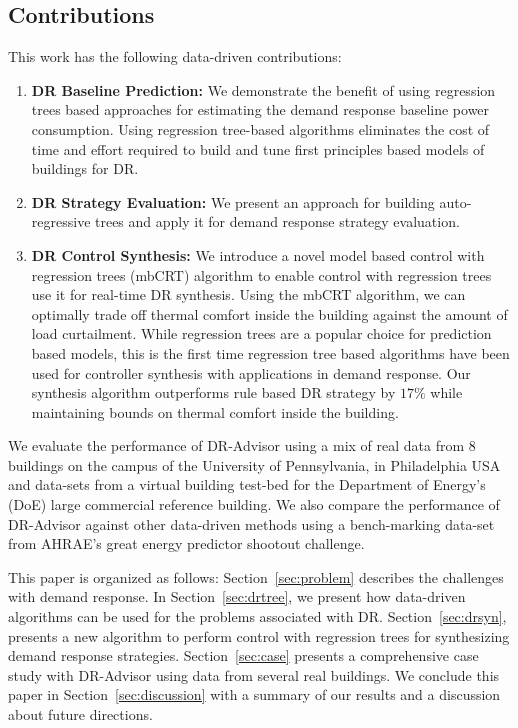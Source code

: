 \documentclass{sig-alternate-ipsn13}
\theoremstyle{definition}
\begin{document}
\subsection{Contributions}

This work has the following data-driven contributions:
\begin{enumerate}[leftmargin=0.5cm,topsep=1pt,itemsep=-1ex,partopsep=1ex,parsep=1ex]
\item \textbf{DR Baseline Prediction:} We demonstrate the benefit of using regression trees based approaches for estimating the demand response baseline power consumption. Using regression tree-based algorithms eliminates the cost of time and effort required to build and tune first principles based models of buildings for DR. 
\item \textbf{DR Strategy Evaluation:} We present an approach for building auto-regressive trees and apply it for demand response strategy evaluation. 
\item \textbf{DR Control Synthesis:}  We introduce a novel model based control with regression trees (mbCRT) algorithm to enable control with regression trees use it for real-time DR synthesis. Using the mbCRT algorithm, we can optimally trade off thermal comfort inside the building against the amount of load curtailment. While regression trees are a popular choice for prediction based models, this is the first time regression tree based algorithms have been used for controller synthesis with applications in demand response. Our synthesis algorithm outperforms rule based DR strategy by $17\%$ while maintaining bounds on thermal comfort inside the building.
\end{enumerate}

We evaluate the performance of DR-Advisor using a mix of real data from 8 buildings on the campus of the University of Pennsylvania, in Philadelphia USA and data-sets from a virtual building test-bed for the Department of Energy's (DoE) large commercial reference building.
We also compare the performance of DR-Advisor against other data-driven methods using a bench-marking data-set from AHRAE's great energy predictor shootout challenge.

This paper is organized as follows: Section~\ref{sec:problem} describes the challenges with demand response. 
In Section~\ref{sec:drtree}, we present how data-driven algorithms can be used for the problems associated with DR. 
Section~\ref{sec:drsyn}, presents a new algorithm to perform control with regression trees for synthesizing demand response strategies.
Section~\ref{sec:case} presents a comprehensive case study with DR-Advisor using data from several real buildings.
We conclude this paper in Section~\ref{sec:discussion} with a summary of our results and a discussion about future directions.
\end{document}
